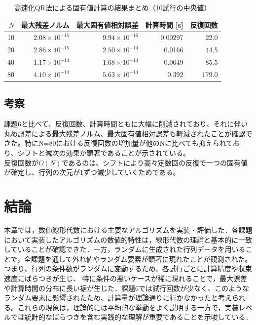 \documentclass[a4paper,11pt]{ltjsarticle}
\begin{document}
\begin{table}[H]
\centering
\caption{高速化QR法による固有値計算の結果まとめ（10試行の中央値）}
\label{tab:exp6_summary}
\begin{tabular}{r|r|r|r|r}
\hline
$N$ & 最大残差ノルム & 最大固有値相対誤差 & 計算時間 [s] & 反復回数 \\
\hline
10  & $2.08\times10^{-15}$ & $9.94\times10^{-15}$ & 0.00297 & 22.0 \\
20  & $2.86\times10^{-15}$ & $2.50\times10^{-14}$ & 0.0166 & 44.5 \\
40  & $1.17\times10^{-14}$ & $1.68\times10^{-14}$ & 0.0649 & 85.5 \\
80  & $4.10\times10^{-14}$ & $5.63\times10^{-14}$ & 0.392 & 179.0 \\
\hline
\end{tabular}
\end{table}

\subsection{考察}
課題6と比べて、反復回数、計算時間ともに大幅に削減されており、それに伴い丸め誤差による最大残差ノルム、最大固有値相対誤差も軽減されたことが確認できた。特にN=80における反復回数の増加量が他のNに比べても抑えられており、シフトと減次の効果が顕著であることが示されている。\\

反復回数が$O(N)$であるのは、シフトにより高々定数回の反復で一つの固有値が確定し、行列の次元が1ずつ減少していくためである。
\section{結論}

本章では，数値線形代数における主要なアルゴリズムを実装・評価した．各課題において実装したアルゴリズムの数値的特性は，線形代数の理論と基本的に一致していることが確認できた．一方，ランダムに生成された行列データを用いることで，全課題を通して外れ値やランダム要素が顕著に現れたことが観測された。つまり、行列の条件数がランダムに変動するため，各試行ごとに計算精度や収束速度にばらつきが生じ、 特に条件の悪いケースが稀に現れることで，最大誤差や計算時間の分布に長い裾が生じた．課題6では試行回数が少なく、このようなランダム要素に影響されたため、計算量が理論通りに行かなかったと考えられる。これらの現象は，理論的には平均的な挙動をよく説明する一方で，実装レベルでは統計的なばらつきを含む実践的な理解が重要であることを示唆している．\\
\end{document}
